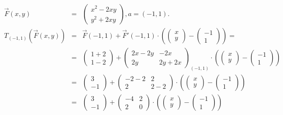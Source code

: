 \documentclass{../../myassignment}
\begin{document}
		\begin{answer}
			\begin{eqnarray*}
				\vec{F}(x,y) &=& \begin{pmatrix} x^2-2xy \\ y^2 + 2xy \end{pmatrix}, a=(-1,1).\\
				T_{(-1,1)}(\vec{F}(x,y)) &=& \vec{F}(-1,1) + \vec{F}'(-1,1) \cdot (\begin{pmatrix} x\\y \end{pmatrix} - \begin{pmatrix} -1\\1 \end{pmatrix}) = \\
										&=& \begin{pmatrix} 1+2\\1-2 \end{pmatrix} + \begin{pmatrix} 2x-2y & -2x \\ 2y & 2y+2x \end{pmatrix}_{(-1,1)} \cdot (\begin{pmatrix} x\\y \end{pmatrix} - \begin{pmatrix} -1\\1 \end{pmatrix})\\
										&=& \begin{pmatrix} 3 \\ -1 \end{pmatrix} + \begin{pmatrix} -2-2 & 2 \\ 2 & 2-2 \end{pmatrix} \cdot (\begin{pmatrix} x\\y \end{pmatrix} - \begin{pmatrix} -1\\1 \end{pmatrix})\\
										&=& \begin{pmatrix} 3 \\ -1 \end{pmatrix} + \begin{pmatrix} -4 & 2 \\ 2 & 0 \end{pmatrix} \cdot (\begin{pmatrix} x\\y \end{pmatrix} - \begin{pmatrix} -1\\1 \end{pmatrix})\\

\end{eqnarray*}
\end{answer}
\end{document}
